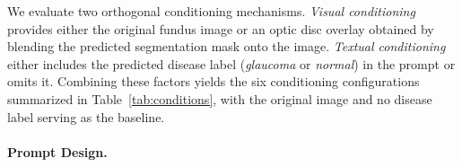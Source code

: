 \documentclass[runningheads]{llncs}
\begin{document}

We evaluate two orthogonal conditioning mechanisms. \emph{Visual conditioning} provides either the original fundus image or an optic disc overlay obtained by blending the predicted segmentation mask onto the image. \emph{Textual conditioning} either includes the predicted disease label (\emph{glaucoma} or \emph{normal}) in the prompt or omits it. Combining these factors yields the six conditioning configurations summarized in Table~\ref{tab:conditions}, with the original image and no disease label serving as the baseline.

\paragraph{Prompt Design.}

\end{document}
